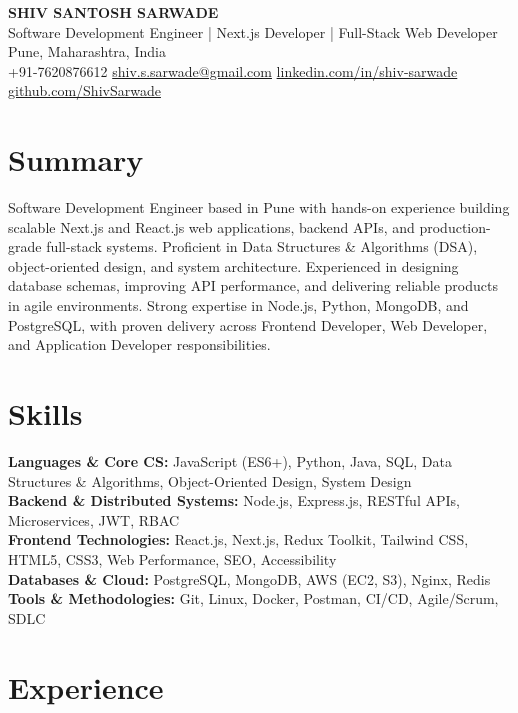 \documentclass[a4paper,10pt]{article}
\begin{document}
\pagestyle{empty}

\begin{center}
    {\LARGE \textbf{SHIV SANTOSH SARWADE}}\\
    Software Development Engineer | Next.js Developer | Full-Stack Web Developer\\[4pt]
    Pune, Maharashtra, India\\
    +91-7620876612 \quad
    \href{mailto:shiv.s.sarwade@gmail.com}{shiv.s.sarwade@gmail.com} \quad
    \href{https://linkedin.com/in/shiv-sarwade}{linkedin.com/in/shiv-sarwade} \quad
    \href{https://github.com/ShivSarwade}{github.com/ShivSarwade}
\end{center}

\section*{Summary}

Software Development Engineer based in Pune with hands-on experience building scalable Next.js and React.js web applications, backend APIs, and production-grade full-stack systems. Proficient in Data Structures \& Algorithms (DSA), object-oriented design, and system architecture. Experienced in designing database schemas, improving API performance, and delivering reliable products in agile environments. Strong expertise in Node.js, Python, MongoDB, and PostgreSQL, with proven delivery across Frontend Developer, Web Developer, and Application Developer responsibilities.

\section*{Skills}

\textbf{Languages \& Core CS:} JavaScript (ES6+), Python, Java, SQL, Data Structures \& Algorithms, Object-Oriented Design, System Design\\
\textbf{Backend \& Distributed Systems:} Node.js, Express.js, RESTful APIs, Microservices, JWT, RBAC\\
\textbf{Frontend Technologies:} React.js, Next.js, Redux Toolkit, Tailwind CSS, HTML5, CSS3, Web Performance, SEO, Accessibility\\
\textbf{Databases \& Cloud:} PostgreSQL, MongoDB, AWS (EC2, S3), Nginx, Redis\\
\textbf{Tools \& Methodologies:} Git, Linux, Docker, Postman, CI/CD, Agile/Scrum, SDLC

\section*{Experience}
\end{document}
